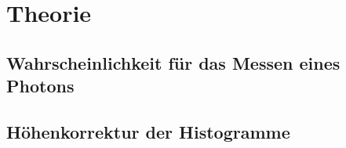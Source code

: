 \section{Theorie}
\label{sec:Theorie}

\subsection{Wahrscheinlichkeit für das Messen eines Photons}
\label{sec:Wahrscheinlichkeitsrechnung}

\subsection{Höhenkorrektur der Histogramme}
\label{sec:TheorieKorrektur}


